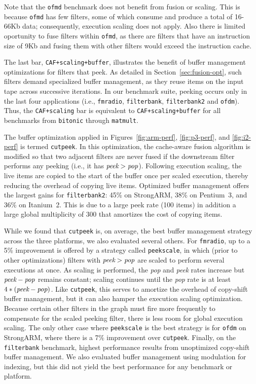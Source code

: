 Note that the \texttt{ofmd} benchmark does not benefit from fusion or
scaling. This is because \texttt{ofmd} has few filters, some of which
consume and produce a total of 16-66Kb data; consequently, execution
scaling does not apply.  Also there is limited oportunity to fuse
filters within \texttt{ofmd}, as there are filters that have an
instruction size of 9Kb and fusing them with other filters would
exceed the instruction cache.

The last bar, {\tt CAF+scaling+buffer}, illustrates the benefit of
buffer management optimizations for filters that peek.  As detailed in
Section~\ref{sec:fusion-opt}, such filters demand specialized buffer
management, as they reuse items on the input tape across successive
iterations.  In our benchmark suite, peeking occurs only in the last
four applications (i.e., \texttt{fmradio}, \texttt{filterbank},
\texttt{filterbank2} and \texttt{ofdm}).  Thus, the {\tt CAF+scaling}
bar is equivalent to {\tt CAF+scaling+buffer} for all benchmarks from
{\tt bitonic} through {\tt matmult}.

The buffer optimization applied in Figures~\ref{fig:arm-perf},
\ref{fig:p3-perf}, and \ref{fig:i2-perf} is termed {\tt cutpeek}.  In
this optimization, the cache-aware fusion algorithm is modified so
that two adjacent filters are never fused if the downstream filter
performs any peeking (i.e., it has $\mbox{\it peek} > \mbox{\it
pop}$).  Following execution scaling, the live items are copied to the
start of the buffer once per scaled execution, thereby reducing the
overhead of copying live items.  Optimized buffer management offers
the largest gains for {\tt filterbank2}: 45\% on StrongARM, 38\% on
Pentium~3, and 36\% on Itanium~2.  This is due to a large peek rate
(100 items) in addition a large global multiplicity of 300 that
amortizes the cost of copying items.

While we found that {\tt cutpeek} is, on average, the best buffer
management strategy across the three platforms, we also evaluated
several others.  For {\tt fmradio}, up to a 5\% improvement is offered
by a strategy called {\tt peekscale}, in which (prior to other
optimizations) filters with $\mbox{\it peek}>\mbox{\it pop}$ are
scaled to perform several executions at once.  As scaling is
performed, the {\it pop} and {\it peek} rates increase but $\mbox{{\it
peek}} - \mbox{\it pop}$ remains constant; scaling continues until the
{\it pop} rate is at least $4*(\mbox{{\it peek}} - \mbox{{\it pop}})$.
Like {\tt cutpeek}, this serves to amortize the overhead of copy-shift
buffer management, but it can also hamper the execution scaling
optimization.  Because certain other filters in the graph must fire
more frequently to compensate for the scaled peeking filter, there is
less room for global execution scaling.  The only other case where
{\tt peekscale} is the best strategy is for {\tt ofdm} on StrongARM,
where there is a 7\% improvement over {\tt cutpeek}.  Finally, on the
{\tt filterbank} benchmark, highest performance results from
unoptimized copy-shift buffer management.  We also evaluated buffer
management using modulation for indexing, but this did not yield the
best performance for any benchmark or platform.

